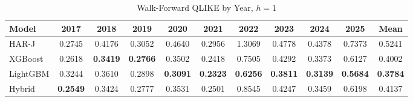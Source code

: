 \begin{table}[htbp]
\centering
\caption{Walk-Forward QLIKE by Year, $h=1$}
\label{tab:wf_qlike_h1}
\begin{tabular}{lcccccccccc}
\hline
Model & 2017 & 2018 & 2019 & 2020 & 2021 & 2022 & 2023 & 2024 & 2025 & Mean \\
\hline
HAR-J & 0.2745 & 0.4176 & 0.3052 & 0.4640 & 0.2956 & 1.3069 & 0.4778 & 0.4378 & 0.7373 & 0.5241 \\
XGBoost & 0.2618 & \textbf{0.3419} & \textbf{0.2766} & 0.3502 & 0.2418 & 0.7505 & 0.4292 & 0.3373 & 0.6127 & 0.4002 \\
LightGBM & 0.3244 & 0.3610 & 0.2898 & \textbf{0.3091} & \textbf{0.2323} & \textbf{0.6256} & \textbf{0.3811} & \textbf{0.3139} & \textbf{0.5684} & \textbf{0.3784} \\
Hybrid & \textbf{0.2549} & 0.3424 & 0.2777 & 0.3531 & 0.2501 & 0.8545 & 0.4247 & 0.3459 & 0.6198 & 0.4137 \\
\hline
\end{tabular}
\end{table}
